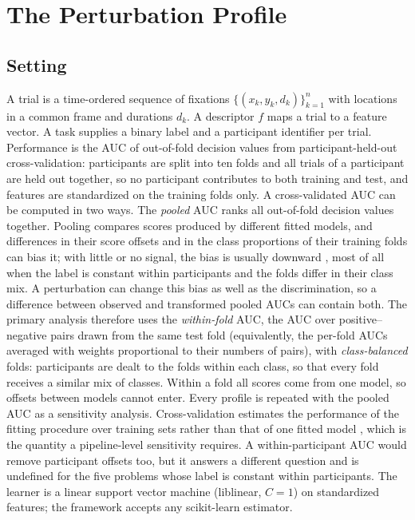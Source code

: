 \section{The Perturbation Profile}
\subsection{Setting}
A trial is a time-ordered sequence of fixations $\{(x_k, y_k, d_k)\}_{k=1}^{n}$ with locations in a common frame and durations $d_k$. A descriptor $f$ maps a trial to a feature vector. A task supplies a binary label and a participant identifier per trial. Performance is the AUC of out-of-fold decision values from participant-held-out cross-validation: participants are split into ten folds and all trials of a participant are held out together, so no participant contributes to both training and test, and features are standardized on the training folds only. A cross-validated AUC can be computed in two ways. The \emph{pooled} AUC ranks all out-of-fold decision values together. Pooling compares scores produced by different fitted models, and differences in their score offsets and in the class proportions of their training folds can bias it; with little or no signal, the bias is usually downward \citep{parker2007stratification, airola2011comparison}, most of all when the label is constant within participants and the folds differ in their class mix. A perturbation can change this bias as well as the discrimination, so a difference between observed and transformed pooled AUCs can contain both. The primary analysis therefore uses the \emph{within-fold} AUC, the AUC over positive--negative pairs drawn from the same test fold (equivalently, the per-fold AUCs averaged with weights proportional to their numbers of pairs), with \emph{class-balanced} folds: participants are dealt to the folds within each class, so that every fold receives a similar mix of classes. Within a fold all scores come from one model, so offsets between models cannot enter. Every profile is repeated with the pooled AUC as a sensitivity analysis. Cross-validation estimates the performance of the fitting procedure over training sets rather than that of one fitted model \citep{bates2024cross}, which is the quantity a pipeline-level sensitivity requires. A within-participant AUC would remove participant offsets too, but it answers a different question and is undefined for the five problems whose label is constant within participants. The learner is a linear support vector machine (liblinear, $C = 1$) on standardized features; the framework accepts any scikit-learn estimator.

